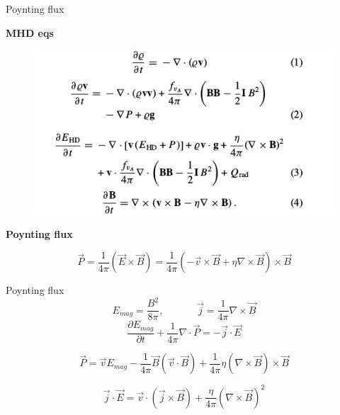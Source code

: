 \documentclass{beamer}
\begin{document}
\newcommand{\tikzAngleOfLine}{\tikz@AngleOfLine}
  \def\tikz@AngleOfLine(#1)(#2)#3{%
  \pgfmathanglebetweenpoints{%
    \pgfpointanchor{#1}{center}}{%
    \pgfpointanchor{#2}{center}}
  \pgfmathsetmacro{#3}{\pgfmathresult}%
  }



\begin{frame}{Poynting flux}

\bf{MHD eqs} 
 
\begin{figure}[H]
 \centering
 \includegraphics[scale=0.5]{eqs.png}
\end{figure}

\bf{Poynting flux} 

\begin{equation}
\vec{P} = \frac{1}{4 \pi} \left ( \vec{E} \times \vec{B}  \right ) = \frac{1}{4 \pi} 
 (- \vec{v} \times \vec{B}  + \eta \nabla \times \vec{B}) \times \vec{B}
\end{equation}

\end{frame}

\begin{frame}{Poynting flux}
\begin{equation}
E_{mag} = \frac{B^2}{8 \pi} , \;\;\;\; \;\;\;\; \;\;\;\;  \vec{j} = \frac{1}{4 \pi} \nabla \times \vec{B}
\end{equation}
\begin{equation}
\frac{\partial E_{mag}}{\partial t} + \frac{1}{4 \pi} \nabla \cdot \vec{P} = -\vec{j} \cdot \vec{E}
\end{equation}

\begin{equation}
\vec{P} =  \vec{v} E_{mag} - \frac{1}{4 \pi} \vec{B}(\vec{v} \cdot \vec{B}) + 
 \frac{1}{4 \pi} \eta (  \nabla \times \vec{B})  \times \vec{B} 
\end{equation}


\begin{equation}
\vec{j} \cdot \vec{E} = \vec{v} \cdot \left( \vec{j} \times \vec{B} \right) + \frac{\eta}{4 \pi} \left ( \nabla \times \vec{B} \right )^2
\end{equation}

\end{frame}
\end{document}
